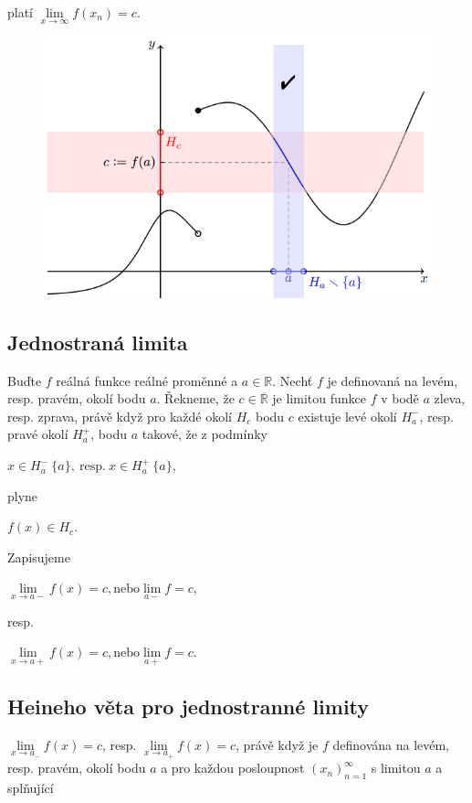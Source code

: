 \documentclass{szzclass}
\begin{document}
platí
$\lim\limits_{x \rightarrow \infty} f(x_n) = c$.

\begin{figure}[h]
    \includegraphics[width=.6\textwidth, center]{topics/bi-spol-34/images/nor_lim.png}
\end{figure}

\newpage

\subsection{Jednostraná limita}
Buďte $f$ reálná funkce reálné proměnné a $a \in \mathbb{R}$.
Nechť $f$ je definovaná na levém, resp. pravém, okolí bodu $a$.
Řekneme, že $c\in\overline{\mathbb{R}}$ je limitou funkce
$f$ v bodě $a$ zleva, resp. zprava, právě když pro každé okolí
$H_c$ bodu $c$ existuje levé okolí $H^−_a$, resp. pravé okolí
$H^+_a$, bodu $a$ takové, že z podmínky

\begin{center}
$x \in H^-_a \ \{a\}, \ \text{resp.} \ x \in H^+_a \ \{a\}$,
\end{center}
plyne
\begin{center}
$f(x) \in H_c$.
\end{center}
Zapisujeme
\begin{center}
$\lim\limits_{x\to a-} f(x) = c, \text{nebo} \lim\limits_{a-} f = c$,
\end{center}
resp.
\begin{center}
$\lim\limits_{x\to a+} f(x) = c, \text{nebo} \lim\limits_{a+} f = c$.
\end{center}

\subsection{Heineho věta pro jednostranné limity}
$\lim\limits_{x \rightarrow a_-} f(x) = c$, resp.
$\lim\limits_{x \rightarrow a_+} f(x) = c$,
právě když je $f$ definována na levém, resp.
pravém, okolí bodu $a$ a pro každou posloupnost
$(x_n)_{n=1}^\infty$ s limitou $a$ a splňující
\end{document}
